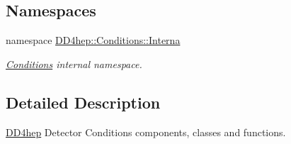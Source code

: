 \subsection*{Namespaces}
\begin{DoxyCompactItemize}
\item 
namespace \hyperlink{namespace_d_d4hep_1_1_conditions_1_1_interna}{DD4hep::Conditions::Interna}


\begin{DoxyCompactList}\small\item\em \hyperlink{namespace_d_d4hep_1_1_conditions}{Conditions} internal namespace. \item\end{DoxyCompactList}\end{DoxyCompactItemize}


\subsection{Detailed Description}
\hyperlink{namespace_d_d4hep}{DD4hep} Detector Conditions components, classes and functions. 